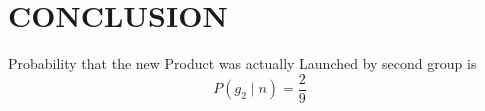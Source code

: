 \documentclass[journal,12pt,twocolumn]{IEEEtran}
\begin{document}
\section{CONCLUSION}
Probability that the new Product was actually Launched by second group is 
\begin{equation*}
   P(g_2\mid n)=\frac{2}{9}
\end{equation*}
\end{document}
